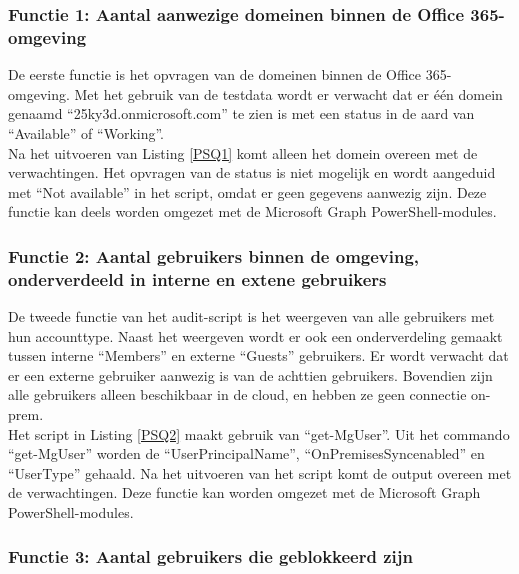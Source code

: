 \subsubsection{Functie 1: Aantal aanwezige domeinen binnen de Office 365-omgeving}


De eerste functie is het opvragen van de domeinen binnen de Office 365-omgeving. Met het gebruik van de testdata wordt er verwacht dat er één domein genaamd “25ky3d.onmicrosoft.com” te zien is met een status in de aard van “Available” of “Working”. \\

Na het uitvoeren van Listing \ref{PSQ1} komt alleen het domein overeen met de verwachtingen. Het opvragen van de status is niet mogelijk en wordt aangeduid met “Not available” in het script, omdat er geen gegevens aanwezig zijn. Deze functie kan deels worden omgezet met de Microsoft Graph PowerShell-modules.

\subsubsection{Functie 2: Aantal gebruikers binnen de omgeving, onderverdeeld in interne en extene gebruikers}


De tweede functie van het audit-script is het weergeven van alle gebruikers met hun accounttype. Naast het weergeven wordt er ook een onderverdeling gemaakt tussen interne “Members” en externe “Guests” gebruikers. Er wordt verwacht dat er een externe gebruiker aanwezig is van de achttien gebruikers. Bovendien zijn alle gebruikers alleen beschikbaar in de cloud, en hebben ze geen connectie \ac{on-prem}. \\

Het script in Listing \ref{PSQ2} maakt gebruik van “get-MgUser”. Uit het commando “get-MgUser” worden de “UserPrincipalName”, “OnPremisesSyncenabled” en “UserType” gehaald.  Na het uitvoeren van het script komt de output overeen met de verwachtingen. Deze functie kan worden omgezet met de Microsoft Graph PowerShell-modules. \\

\subsubsection{Functie 3: Aantal gebruikers die geblokkeerd zijn}


